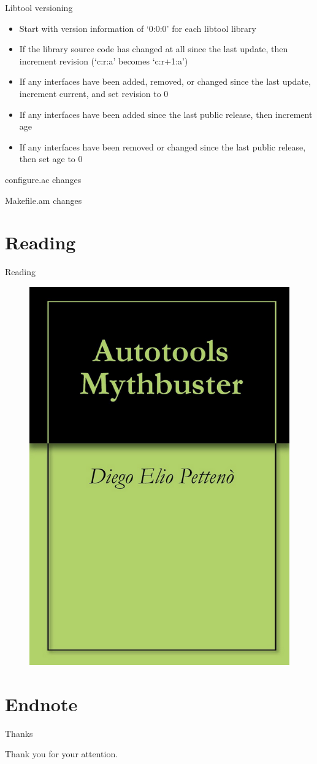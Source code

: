 \documentclass{beamer}
\begin{document}
\begin{frame}{Libtool versioning}
	\begin{itemize}
	\item Start with version information of ‘0:0:0’ for each libtool library
	\item If the library source code has changed at all since the last update, then increment revision (‘c:r:a’ becomes ‘c:r+1:a’)
	\item If any interfaces have been added, removed, or changed since the last update, increment current, and set revision to 0
	\item If any interfaces have been added since the last public release, then increment age
	\item If any interfaces have been removed or changed since the last public release, then set age to 0
	\end{itemize}
\end{frame}

\begin{frame}[t]{configure.ac changes}
	\begin{small}
	
	\end{small}
\end{frame}

\begin{frame}[t]{Makefile.am changes}
	\begin{small}
	
	\end{small}
\end{frame}


\section{Reading}

\begin{frame}{Reading}
	\begin{figure}
	\includegraphics[width= 0.4\linewidth]{mythbuster.png}
	\end{figure}
\end{frame}

\section{Endnote}

\begin{frame}{Thanks}
	\begin{center}
	Thank you for your attention.
	\end{center}
\end{frame}
\end{document}
